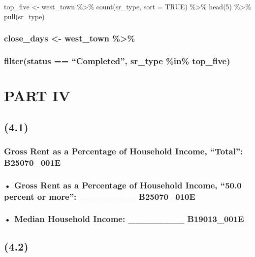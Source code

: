 \documentclass[
]{article}
\begin{document}
top\_five \textless- west\_town \%\textgreater\% count(sr\_type, sort =
TRUE) \%\textgreater\% head(5) \%\textgreater\% pull(sr\_type)

\subsubsection{close\_days \textless- west\_town
\%\textgreater\%}\label{close_days---west_town}

\subsubsection{filter(status == ``Completed'', sr\_type \%in\%
top\_five)}\label{filterstatus-completed-sr_type-in-top_five}

\section{PART IV}\label{part-iv}

\subsection{(4.1)}\label{section-8}

\subsubsection{Gross Rent as a Percentage of Household Income,
``Total'':
B25070\_001E}\label{gross-rent-as-a-percentage-of-household-income-total-b25070_001e}

\subsubsection{• Gross Rent as a Percentage of Household Income, ``50.0
percent or more'': \_\_\_\_\_\_\_\_
B25070\_010E}\label{gross-rent-as-a-percentage-of-household-income-50.0-percent-or-more-________-b25070_010e}

\subsubsection{• Median Household Income: \_\_\_\_\_\_\_\_
B19013\_001E}\label{median-household-income-________-b19013_001e}

\subsection{(4.2)}\label{section-9}
\end{document}
